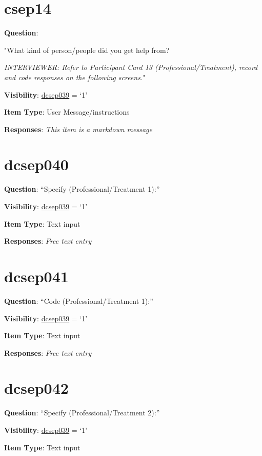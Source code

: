 \documentclass[]{book}
\begin{document}
\hypertarget{csep14}{%
\section{csep14}\label{csep14}}

\textbf{Question}:

"What kind of person/people did you get help from?

\emph{INTERVIEWER: Refer to Participant Card 13 (Professional/Treatment), record and code responses on the following screens.}"

\textbf{Visibility}: \protect\hyperlink{dcsep039}{dcsep039} = `1'

\textbf{Item Type}: User Message/instructions

\textbf{Responses}: \emph{This item is a markdown message}

\hypertarget{dcsep040}{%
\section{dcsep040}\label{dcsep040}}

\textbf{Question}: ``Specify (Professional/Treatment 1):''

\textbf{Visibility}: \protect\hyperlink{dcsep039}{dcsep039} = `1'

\textbf{Item Type}: Text input

\textbf{Responses}: \emph{Free text entry}

\hypertarget{dcsep041}{%
\section{dcsep041}\label{dcsep041}}

\textbf{Question}: ``Code (Professional/Treatment 1):''

\textbf{Visibility}: \protect\hyperlink{dcsep039}{dcsep039} = `1'

\textbf{Item Type}: Text input

\textbf{Responses}: \emph{Free text entry}

\hypertarget{dcsep042}{%
\section{dcsep042}\label{dcsep042}}

\textbf{Question}: ``Specify (Professional/Treatment 2):''

\textbf{Visibility}: \protect\hyperlink{dcsep039}{dcsep039} = `1'

\textbf{Item Type}: Text input
\end{document}
